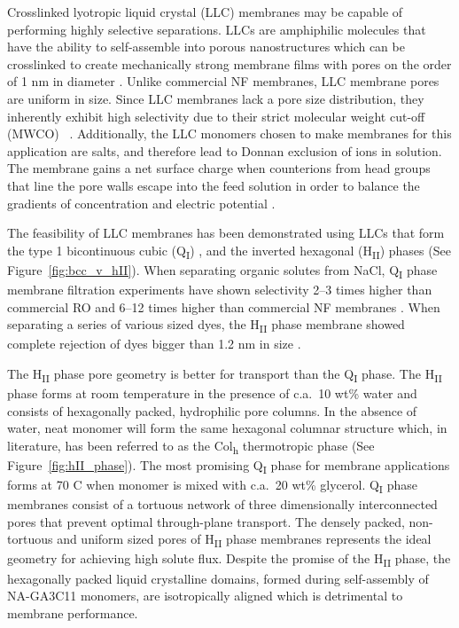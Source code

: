 \documentclass[journal=jpcbfk,manusciprt=article]{achemso}
\begin{document}
  Crosslinked lyotropic liquid crystal (LLC) membranes may be capable of
  performing highly selective separations. LLCs are amphiphilic molecules that
  have the ability to self-assemble into porous nanostructures
  \cite{smith_ordered_1997} which can be crosslinked to create mechanically
  strong membrane films with pores on the order of 1 nm in diameter
  \cite{zhou_supported_2005}. Unlike commercial NF membranes, LLC membrane pores
  are uniform in size. Since LLC membranes lack a pore size distribution, they
  inherently exhibit high selectivity due to their strict molecular weight
  cut-off (MWCO) ~\cite{zhou_supported_2005}. Additionally, the LLC monomers
  chosen to make membranes for this application are salts, and therefore lead to
  Donnan exclusion of ions in solution. The membrane gains a net surface charge
  when counterions from head groups that line the pore walls escape into the feed
  solution in order to balance the gradients of concentration and electric
  potential \cite{donnan_theory_1995}.    

  The feasibility of LLC membranes has been demonstrated using LLCs that form
  the type 1 bicontinuous cubic (Q\textsubscript{I})
  \cite{hatakeyama_water_2011,hatakeyama_nanoporous_2010,carter_glycerol-based_2012},
  and the inverted hexagonal (H\textsubscript{II}) \cite{zhou_supported_2005}
  phases (See Figure~\ref{fig:bcc_v_hII}). When separating organic solutes from
  NaCl, Q\textsubscript{I} phase membrane filtration experiments have shown
  selectivity 2--3 times higher than commercial RO and 6--12 times higher than
  commercial NF membranes \cite{dischinger_application_2017}.  When separating a
  series of various sized dyes, the H\textsubscript{II} phase membrane showed
  complete rejection of dyes bigger than 1.2 nm in size
  \cite{zhou_supported_2005}. 

  The H\textsubscript{II} phase pore geometry is better for transport than the
  Q\textsubscript{I} phase. The H\textsubscript{II} phase forms at room
  temperature in the presence of c.a.~10 wt\% water and consists of hexagonally
  packed, hydrophilic pore columns\cite{smith_ordered_1997}. In the absence of
  water, neat monomer will form the same hexagonal columnar structure which, in
  literature, has been referred to as the Col\textsubscript{h} thermotropic
  phase\cite{feng_scalable_2014} (See Figure~\ref{fig:hII_phase}).  The most
  promising Q\textsubscript{I} phase for membrane applications forms at 70\degree
  C when monomer is mixed with c.a.~20 wt\%
  glycerol\cite{carter_glycerol-based_2012}. Q\textsubscript{I} phase membranes
  consist of a tortuous network of three dimensionally interconnected pores that
  prevent optimal through-plane transport. The densely packed, non-tortuous and
  uniform sized pores of H\textsubscript{II} phase membranes represents the ideal
  geometry for achieving high solute flux\cite{matyka_tortuosity-porosity_2008}.
  Despite the promise of the H\textsubscript{II} phase, the hexagonally packed
  liquid crystalline domains, formed during self-assembly of NA-GA3C11 monomers, are
  isotropically aligned which is detrimental to membrane performance. 
\end{document}
